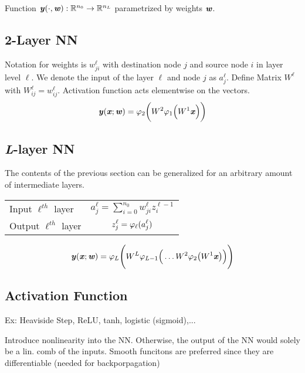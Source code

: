 Function $\textbf{\textit{y}}(\cdot,\textbf{\textit{w}}): \mathbb{R}^{n_0}\rightarrow\mathbb{R}^{n_L}$ parametrized by weights $\textbf{\textit{w}}$.

\subsection{2-Layer NN}
    Notation for weights is $w_{ji}^\ell$ with destination node $j$ and source node $i$ in layer level $\ell$. We denote the input of the layer $\ell$ and node $j$ as $a_j^\ell$.
    Define Matrix $W^\ell$ with $W_{ij}^\ell = w_{ij}^\ell$. Activation function acts elementwise on the vectors.
    \begin{equation*}
        \textbf{\textit{y}}(\textbf{\textit{x}};\textbf{\textit{w}}) = \varphi_2\bigg(W^2\varphi_1\Big(W^1\textbf{\textit{x}}\Big)\bigg)
    \end{equation*}
\subsection{\textit{L}-layer NN}
    The contents of the previous section can be generalized for an arbitrary amount of intermediate layers.
     \begin{center}
            \renewcommand{\arraystretch}{1.3}{\begin{tabular}{l|c}
                Input $\ell^{th}$ layer & $\displaystyle a_j^\ell = \sum_{i=0}^{n_0} w_{ji}^\ell z_i^{\ell - 1}$\\
                Output $\ell^{th}$ layer & $\displaystyle z_j^\ell = \varphi_{\ell}(a_j^\ell)$
            \end{tabular}}
    \end{center}
    \begin{equation*}
        \textbf{\textit{y}}(\textbf{\textit{x}};\textbf{\textit{w}}) = \varphi_L\Bigg(W^L\varphi_{L-1}\Big(\dots W^2\varphi_2\big(W^1\textbf{\textit{x}}\big)\Big)\Bigg)
    \end{equation*}

\subsection{Activation Function}
    Ex: Heaviside Step, ReLU, tanh, logistic (sigmoid),...
    
    Introduce nonlinearity into the NN. Otherwise, the output of the NN would solely be a lin. comb of the inputs. Smooth funcitons are preferred since they are differentiable (needed for backporpagation)
    
